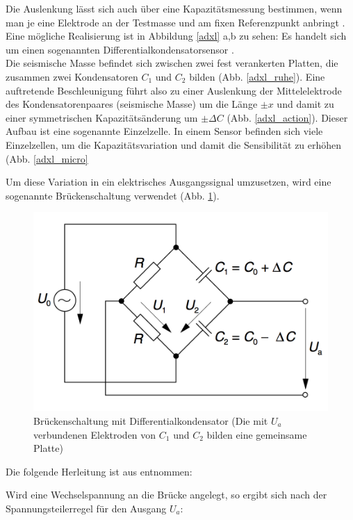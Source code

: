 \documentclass[12pt,a4paper]{scrartcl}
\begin{document}
Die Auslenkung lässt sich auch über eine Kapazitätsmessung bestimmen, wenn man je eine Elektrode an der Testmasse und am fixen Referenzpunkt anbringt \citep{S.J.-Sherman:1992ul}. Eine mögliche Realisierung ist in Abbildung \ref{adxl} a,b zu sehen: Es handelt sich um einen sogenannten Differentialkondensatorsensor \citep{:2002fk}. \\
Die seismische Masse befindet sich zwischen zwei fest verankerten Platten, die zusammen zwei Kondensatoren $C_1$ und $C_2$ bilden (Abb. \ref{adxl_ruhe}). Eine auftretende Beschleunigung führt also zu einer Auslenkung der Mittelelektrode des Kondensatorenpaares (seismische Masse) um die Länge $\pm x$ und damit zu einer symmetrischen Kapazitätsänderung um $\pm \Delta C$ (Abb. \ref{adxl_action}). Dieser Aufbau ist eine sogenannte Einzelzelle. In einem Sensor befinden sich viele Einzelzellen, um die Kapazitätsvariation und damit die Sensibilität zu erhöhen (Abb. \ref{adxl_micro}

Um diese Variation in ein elektrisches Ausgangssignal umzusetzen, wird eine sogenannte Brückenschaltung verwendet (Abb. \ref{bruecke}).

\begin{figure}[H]
\centering
\includegraphics[scale=2]{schaltung_beschleunigungssensor.png}
\caption{Brückenschaltung mit Differentialkondensator (Die mit $U_a$ verbundenen Elektroden von $C_1$ und $C_2$ bilden eine gemeinsame Platte) \citep{:2002fk}}
\label{bruecke}
\end{figure}

Die folgende Herleitung ist aus \citep{:2002fk} entnommen:

Wird eine Wechselspannung an die Brücke angelegt, so ergibt sich nach der Spannungsteilerregel für den Ausgang $U_a$:
\end{document}
